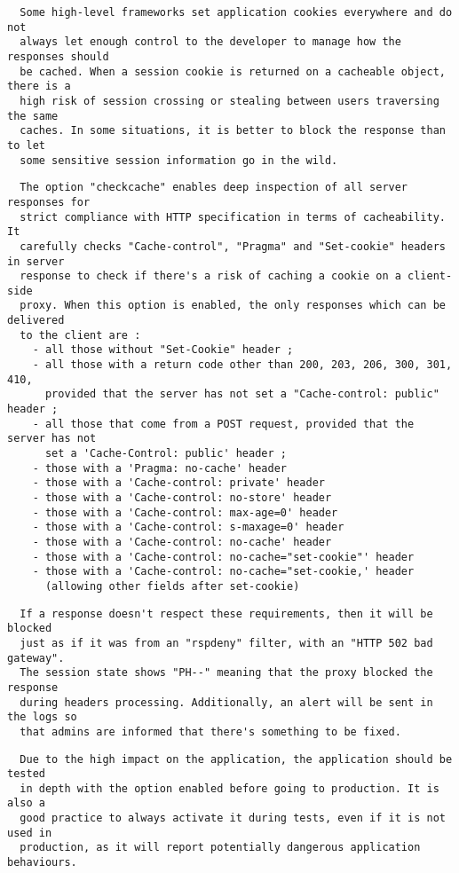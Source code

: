 \begin{verbatim}
  Some high-level frameworks set application cookies everywhere and do not
  always let enough control to the developer to manage how the responses should
  be cached. When a session cookie is returned on a cacheable object, there is a
  high risk of session crossing or stealing between users traversing the same
  caches. In some situations, it is better to block the response than to let
  some sensitive session information go in the wild.
\end{verbatim}

\begin{verbatim}
  The option "checkcache" enables deep inspection of all server responses for
  strict compliance with HTTP specification in terms of cacheability. It
  carefully checks "Cache-control", "Pragma" and "Set-cookie" headers in server
  response to check if there's a risk of caching a cookie on a client-side
  proxy. When this option is enabled, the only responses which can be delivered
  to the client are :
    - all those without "Set-Cookie" header ;
    - all those with a return code other than 200, 203, 206, 300, 301, 410,
      provided that the server has not set a "Cache-control: public" header ;
    - all those that come from a POST request, provided that the server has not
      set a 'Cache-Control: public' header ;
    - those with a 'Pragma: no-cache' header
    - those with a 'Cache-control: private' header
    - those with a 'Cache-control: no-store' header
    - those with a 'Cache-control: max-age=0' header
    - those with a 'Cache-control: s-maxage=0' header
    - those with a 'Cache-control: no-cache' header
    - those with a 'Cache-control: no-cache="set-cookie"' header
    - those with a 'Cache-control: no-cache="set-cookie,' header
      (allowing other fields after set-cookie)
\end{verbatim}

\begin{verbatim}
  If a response doesn't respect these requirements, then it will be blocked
  just as if it was from an "rspdeny" filter, with an "HTTP 502 bad gateway".
  The session state shows "PH--" meaning that the proxy blocked the response
  during headers processing. Additionally, an alert will be sent in the logs so
  that admins are informed that there's something to be fixed.
\end{verbatim}

\begin{verbatim}
  Due to the high impact on the application, the application should be tested
  in depth with the option enabled before going to production. It is also a
  good practice to always activate it during tests, even if it is not used in
  production, as it will report potentially dangerous application behaviours.
\end{verbatim}

